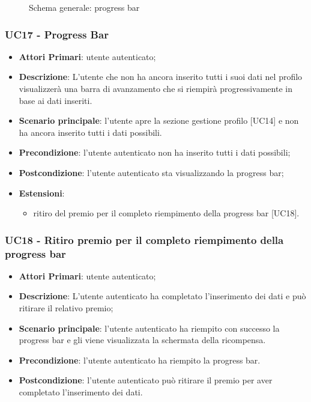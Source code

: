 \begin{figure}[h]
	\centering
	\caption{Schema generale: progress bar}
\end{figure}
\subsubsection{UC17 - Progress Bar}
\begin{itemize}
	\item \textbf{Attori Primari}: utente autenticato;
	\item \textbf{Descrizione}: L'utente che non ha ancora inserito tutti i suoi dati nel profilo visualizzerà una barra di avanzamento che si riempirà progressivamente in base ai dati inseriti.
	\item \textbf{Scenario principale}: l'utente apre la sezione gestione profilo [UC14] e non ha ancora inserito tutti i dati possibili.
	\item \textbf{Precondizione}: l'utente autenticato non ha inserito tutti i dati possibili;
	\item \textbf{Postcondizione}: l'utente autenticato sta visualizzando la progress bar;
	\item \textbf{Estensioni}:
		\begin{itemize}
			\item ritiro del premio per il completo riempimento della progress bar [UC18].
		\end{itemize}	
\end{itemize}

\subsubsection{UC18 - Ritiro premio per il completo riempimento della progress bar}
\begin{itemize}
	\item \textbf{Attori Primari}: utente autenticato;
	\item \textbf{Descrizione}: L'utente autenticato ha completato l'inserimento dei dati e può ritirare il relativo premio;	
	\item \textbf{Scenario principale}: l'utente autenticato ha riempito con successo la progress bar e gli viene visualizzata la schermata della ricompensa.
	\item \textbf{Precondizione}: l'utente autenticato ha riempito la progress bar.
	\item \textbf{Postcondizione}: l'utente autenticato può ritirare il premio per aver completato l'inserimento dei dati.
\end{itemize}
